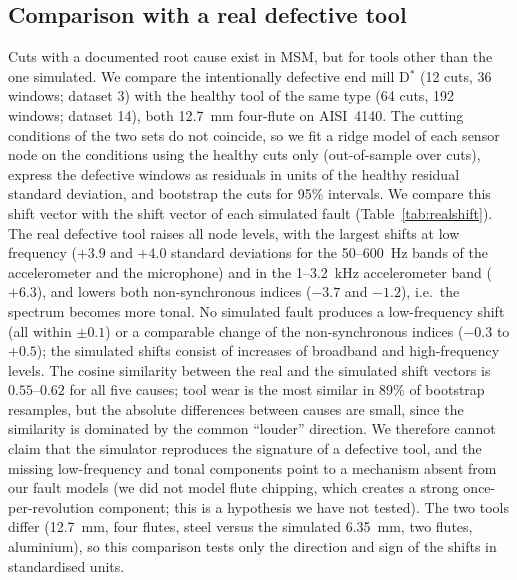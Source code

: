 \documentclass[11pt]{article}
\begin{document}
\subsection{Comparison with a real defective tool}\label{sec:real}
Cuts with a documented root cause exist in MSM, but for tools other than the one simulated.
We compare the intentionally defective end mill D$^*$ (12 cuts, 36 windows; dataset 3) with the healthy tool of the same type (64 cuts, 192 windows; dataset 14), both 12.7~mm four-flute on AISI~4140.
The cutting conditions of the two sets do not coincide, so we fit a ridge model of each sensor node on the conditions using the healthy cuts only (out-of-sample over cuts), express the defective windows as residuals in units of the healthy residual standard deviation, and bootstrap the cuts for 95\% intervals.
We compare this shift vector with the shift vector of each simulated fault (Table~\ref{tab:realshift}).
The real defective tool raises all node levels, with the largest shifts at low frequency ($+3.9$ and $+4.0$ standard deviations for the 50--600~Hz bands of the accelerometer and the microphone) and in the 1--3.2~kHz accelerometer band ($+6.3$), and lowers both non-synchronous indices ($-3.7$ and $-1.2$), i.e.\ the spectrum becomes more tonal.
No simulated fault produces a low-frequency shift (all within $\pm0.1$) or a comparable change of the non-synchronous indices ($-0.3$ to $+0.5$); the simulated shifts consist of increases of broadband and high-frequency levels.
The cosine similarity between the real and the simulated shift vectors is $0.55$--$0.62$ for all five causes; tool wear is the most similar in 89\% of bootstrap resamples, but the absolute differences between causes are small, since the similarity is dominated by the common ``louder'' direction.
We therefore cannot claim that the simulator reproduces the signature of a defective tool, and the missing low-frequency and tonal components point to a mechanism absent from our fault models (we did not model flute chipping, which creates a strong once-per-revolution component; this is a hypothesis we have not tested).
The two tools differ (12.7~mm, four flutes, steel versus the simulated 6.35~mm, two flutes, aluminium), so this comparison tests only the direction and sign of the shifts in standardised units.
\begin{table}[t]\centering\footnotesize

\caption{Shift of each sensor node in units of the healthy standard deviation: real defective tool D$^*$ (with 95\% bootstrap intervals over cuts) versus the five simulated faults.}\label{tab:realshift}
\end{table}
\end{document}
